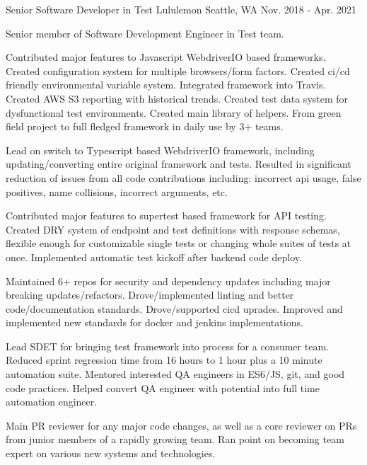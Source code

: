 

\begin{cventries}

  \cventry
    {Senior Software Developer in Test} %
    {Lululemon} %
    {Seattle, WA} %
    {Nov. 2018 - Apr. 2021} %
    {
      \begin{cvitems} %
        \item[] {Senior member of Software Development Engineer in Test team.}
        \item[]
        \item {Contributed major features to Javascript WebdriverIO based frameworks. Created configuration system for multiple browsers/form factors. Created ci/cd friendly environmental variable system. Integrated framework into Travis. Created AWS S3 reporting with historical trends. Created test data system for dysfunctional test environments. Created main library of helpers. From green field project to full fledged framework in daily use by 3+ teams.}
        \item {Lead on switch to Typescript based WebdriverIO framework, including updating/converting entire original framework and tests. Resulted in significant reduction of issues from all code contributions including: incorrect api usage, false positives, name collisions, incorrect arguments, etc.}
        \item {Contributed major features to supertest based framework for API testing. Created DRY system of endpoint and test definitions with response schemas, flexible enough for customizable single tests or changing whole suites of tests at once. Implemented automatic test kickoff after backend code deploy.}
        \item {Maintained 6+ repos for security and dependency updates including major breaking updates/refactors. Drove/implemented linting and better code/documentation standards. Drove/supported cicd uprades. Improved and implemented new standards for docker and jenkins implementations.}
        \item {Lead SDET for bringing test framework into process for a consumer team. Reduced sprint regression time from 16 hours to 1 hour plus a 10 minute automation suite. Mentored interested QA engineers in ES6/JS, git, and good code practices. Helped convert QA engineer with potential into full time automation engineer.}
        \item {Main PR reviewer for any major code changes, as well as a core reviewer on PRs from junior members of a rapidly growing team. Ran point on becoming team expert on various new systems and technologies.}
      \end{cvitems}
    }


\end{cventries}

